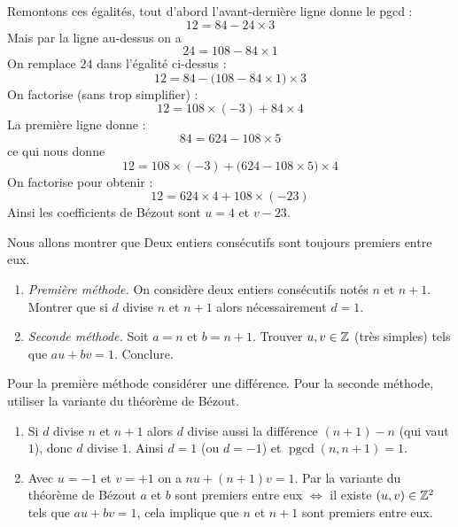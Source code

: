 \documentclass[11pt,class=report,crop=false]{standalone}
\newcommand{\pgcd}{\mathop{\mathrm{pgcd}}\nolimits}
\begin{document}
\begin{enumerate}
    Remontons ces égalités, tout d'abord l'avant-dernière ligne donne le pgcd :
    $$\boxed{12} = 84 -24 \times 3$$
    Mais par la ligne au-dessus on a 
    $$24 = 108 - 84 \times 1$$
    On remplace $24$ dans l'égalité ci-dessus :
    $$\boxed{12} = 84 - \big( 108 - 84 \times 1\big)\times 3$$
    On factorise (sans trop simplifier) :
    $$\boxed{12} = 108 \times (-3)  + 84 \times 4$$
    La première ligne donne :
    $$84 = 624 - 108 \times 5$$
    ce qui nous donne
    $$\boxed{12} = 108 \times (-3)  + \big( 624 - 108 \times 5 \big) \times 4$$
    On factorise pour obtenir :
    $$\boxed{12} = 624 \times 4 + 108 \times (-23)$$
    Ainsi les coefficients de Bézout sont $u=4$ et $v-23$.
    
    
\end{enumerate}
\fincorrection
\finexercice




\exercice{}
\enonce
Nous allons montrer que \og{}Deux entiers consécutifs sont toujours premiers entre eux.\fg{}
\begin{enumerate}
    \item \emph{Première méthode.} On considère deux entiers consécutifs notés $n$ et $n+1$. Montrer que si $d$ divise $n$ et $n+1$ alors nécessairement $d=1$. 
    
    \item \emph{Seconde méthode.} Soit $a=n$ et $b=n+1$. Trouver $u,v \in \mathbb{Z}$ (très simples) tels que $au+bv=1$. Conclure.
\end{enumerate} 
\finenonce

\indication
Pour la première méthode considérer une différence.
Pour la seconde méthode, utiliser la variante du théorème de Bézout.
\finindication

\correction
\sauteligne
\begin{enumerate}
    \item Si $d$ divise $n$ et $n+1$ alors $d$ divise aussi la différence $(n+1) - n$ (qui vaut $1$), donc $d$ divise $1$. Ainsi $d=1$ (ou $d=-1$) et $\pgcd(n,n+1)=1$.
    
    \item Avec $u=-1$ et $v=+1$ on a $nu+(n+1)v=1$. Par la variante du théorème de Bézout \og{}$a$ et $b$ sont premiers entre eux $\iff$ il existe $(u,v) \in \mathbb{Z}^2$ tels que $au+bv=1$\fg{}, cela implique que $n$ et $n+1$ sont premiers entre eux.
\end{enumerate}
\fincorrection
\finexercice
\end{document}
